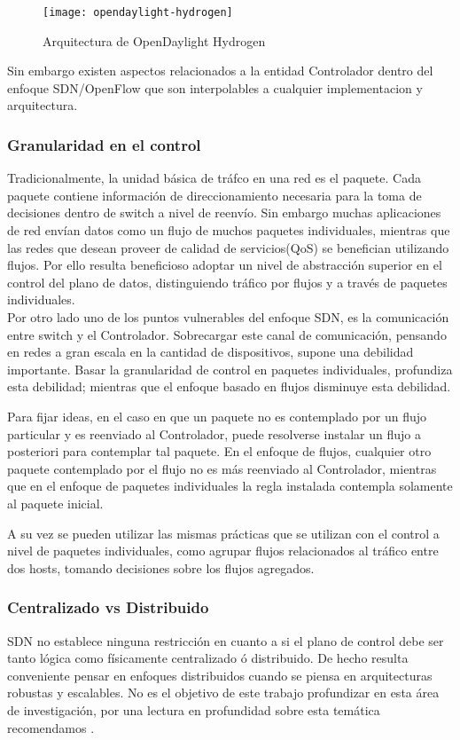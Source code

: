 \begin{figure}[ht!] 
\centering    
\texttt{[image: opendaylight-hydrogen]}
\caption[OF 1.3.3 Matching Fields]{Arquitectura de OpenDaylight Hydrogen}
\label{fig:OpenDayLightHydrogen}
\end{figure}

Sin embargo existen aspectos relacionados a la entidad Controlador dentro del enfoque SDN/OpenFlow que son interpolables a cualquier implementacion y arquitectura.
  
\subsubsection{Granularidad en el control}
Tradicionalmente, la unidad básica de tráfco en una red es el paquete. Cada paquete contiene información de direccionamiento necesaria para la toma de decisiones dentro de switch a nivel de reenvío. Sin embargo muchas aplicaciones de red envían datos como un flujo de muchos paquetes individuales, mientras que las redes que desean proveer de calidad de servicios(QoS) se benefician utilizando flujos. Por ello resulta beneficioso adoptar un nivel de abstracción superior en el control del plano de datos, distinguiendo tr\'afico por flujos y a través de paquetes individuales.\\
 
Por otro lado uno de los puntos vulnerables del enfoque SDN, es la comunicación entre switch y el Controlador. Sobrecargar este canal de comunicación, pensando en redes a gran escala en la cantidad de dispositivos, supone una debilidad importante. Basar la granularidad de control en paquetes individuales, profundiza esta debilidad; mientras que el enfoque basado en flujos disminuye esta debilidad. 

Para fijar ideas, en el caso en que un paquete no es contemplado por un flujo particular y es reenviado al Controlador, puede resolverse instalar un flujo a posteriori para contemplar tal paquete. En el enfoque de flujos, cualquier otro paquete contemplado por el flujo no es m\'as reenviado al Controlador, mientras que en el enfoque de paquetes individuales la regla instalada contempla solamente al paquete inicial.

A su vez se pueden utilizar las mismas prácticas que se utilizan con el control a nivel
de paquetes individuales, como agrupar flujos relacionados al tráfico entre dos hosts, tomando
decisiones sobre los flujos agregados. 

\subsubsection{Centralizado vs Distribuido}
SDN no establece ninguna restricción en cuanto a si el plano de control debe ser tanto lógica como físicamente centralizado \'o distribuido. De hecho resulta conveniente pensar en enfoques distribuidos cuando se piensa en arquitecturas robustas y escalables. No es el objetivo de este trabajo profundizar en esta área de investigación, por una lectura en profundidad sobre esta temática recomendamos \cite{heller2012controller}\cite{levin2012logically}. 

